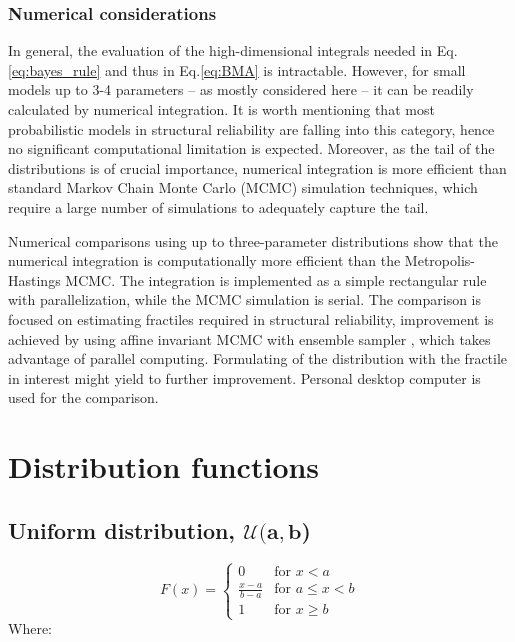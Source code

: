 \subsubsection*{Numerical considerations}

In general, the evaluation of the high-dimensional integrals needed in Eq.\ref{eq:bayes_rule} and thus in Eq.\ref{eq:BMA} is intractable. However, for small models up to 3-4 parameters -- as mostly considered here -- it can be readily calculated by numerical integration. It is worth mentioning that most probabilistic models in structural reliability are falling into this category, hence no significant computational limitation is expected. Moreover, as the tail of the distributions is of crucial importance, numerical integration is more efficient than standard Markov Chain Monte Carlo (MCMC) simulation techniques, which require a large number of simulations to adequately capture the tail.

Numerical comparisons using up to three-parameter distributions show that the numerical integration is computationally more efficient than the Metropolis-Hastings MCMC. The integration is implemented as a simple rectangular rule with parallelization, while the MCMC simulation is serial. The comparison is focused on estimating fractiles required in structural reliability, improvement is achieved by using affine invariant MCMC with ensemble sampler \citep{Goodman2010}, which takes advantage of parallel computing. Formulating of the distribution with the fractile in interest might yield to further improvement. Personal desktop computer is used for the comparison.

\section{Distribution functions}
\label{sec:distr_fun}

\subsection*{Uniform distribution, $\boldsymbol{\mathcal{U}(a,b}$)}

\begin{equation}
	F(x)= \begin{cases} 0 & \text{for }x < a \\[8pt] \frac{x-a}{b-a} & \text{for }a \le x < b \\[8pt] 1 & \text{for }x \ge b \end{cases}
\end{equation}	
Where:

